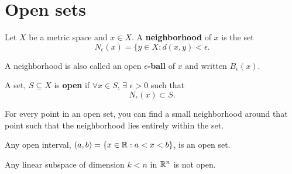 \section{Open sets}

\begin{definition}
  Let $X$ be a metric space and $x \in X$. A \textbf{neighborhood} of
  $x$ is the set 
  \[ N_\epsilon (x) = \{y \in X: d(x,y) < \epsilon. \]
\end{definition}
A neighborhood is also called an open $\epsilon$\textbf{-ball} of $x$
and written $B_{\epsilon}(x)$. 
\begin{definition}
  A set, $S \subseteq X$ is \textbf{open} if $\forall x \in S$,
  $\exists$ $\epsilon>0$ such that 
  \[ N_\epsilon(x) \subset S. \]
\end{definition}
For every point in an open set, you can find a small neighborhood
around that point such that the neighborhood lies entirely within the
set. 
\begin{example}
  Any open interval, $(a,b) = \{x \in \mathbb{R}: a<x<b\}$, is an open set. 
\end{example}
\begin{example}
  Any linear subspace of dimension $k < n$ in $\mathbb{R}^n$ is not open. 
\end{example}

